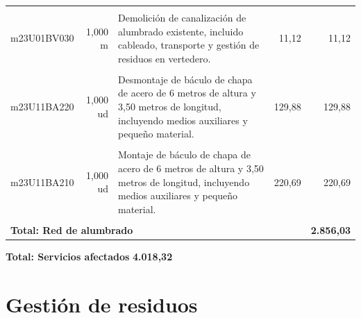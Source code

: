 \documentclass{book}%
\begin{document}
\begin{longtable}{lrlrr}
&&&&\\%
m23U01BV030&     1,000 m&\multicolumn{1}{p{5cm}}{Demolición de canalización de alumbrado existente, incluido cableado, transporte y gestión de residuos en vertedero.}&     11,12&11,12\\%
&&&&\\%
m23U11BA220&     1,000 ud&\multicolumn{1}{p{5cm}}{Desmontaje de báculo de chapa de acero de 6 metros de altura y 3,50 metros de longitud, incluyendo medios auxiliares y pequeño material.}&    129,88&129,88\\%
&&&&\\%
m23U11BA210&     1,000 ud&\multicolumn{1}{p{5cm}}{Montaje de báculo de chapa de acero de 6 metros de altura y 3,50 metros de longitud, incluyendo medios auxiliares y pequeño material.}&    220,69&220,69\\%
&&&&\\%
\multicolumn{4}{p{8cm}}{\textbf{Total: Red de alumbrado}}&\textbf{2.856,03}\\%
\end{longtable}%
\normalsize

%
\noindent%
\large%
\textbf{Total: Servicios afectados }%
\dotfill%
\textbf{4.018,32}%
\newline%
\normalsize

%
\section{Gestión de residuos}%
\end{document}
